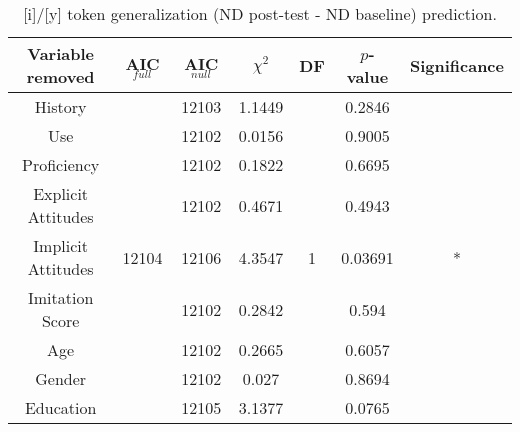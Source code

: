 \begin{table}
\centering
 \begin{tabular}{|c||c|c|c|c|c|c|} 
 \hline
 \textbf{Variable removed} & \textbf{AIC$_{full}$} & \textbf{AIC$_{null}$} & $\chi^2$ & \textbf{DF} & \textbf{$p$-value} & \textbf{Significance}\\ [0.5ex] 
 \hline
  History & \multirow{9}{*}{12104} & 12103 & 1.1449 & \multirow{9}{*}{1} & 0.2846 & \\ 
 \cline{1-1}\cline{3-4}\cline{6-7}
 Use &  & 12102 & 0.0156 &  & 0.9005 & \\
 \cline{1-1}\cline{3-4}\cline{6-7}
 Proficiency &  & 12102 & 0.1822 &  & 0.6695 & \\
 \cline{1-1}\cline{3-4}\cline{6-7}
 Explicit Attitudes &  & 12102 & 0.4671 &  & 0.4943 & \\
 \cline{1-1}\cline{3-4}\cline{6-7}
 Implicit Attitudes &  & 12106 & 4.3547 &  & 0.03691 & *\\
 \cline{1-1}\cline{3-4}\cline{6-7}
 Imitation Score &  & 12102 & 0.2842 &  & 0.594 & \\
 \cline{1-1}\cline{3-4}\cline{6-7}
 Age &  & 12102 & 0.2665 &  & 0.6057 & \\
 \cline{1-1}\cline{3-4}\cline{6-7}
 Gender &  & 12102 & 0.027 &  & 0.8694 & \\
 \cline{1-1}\cline{3-4}\cline{6-7}
 Education &  & 12105 & 3.1377 &  & 0.0765 & \\
 \hline
\end{tabular}
\caption{[i]/[y] token generalization (ND post-test - ND baseline) prediction.}
\label{tab:IYtokengnPredictors}
\end{table}

